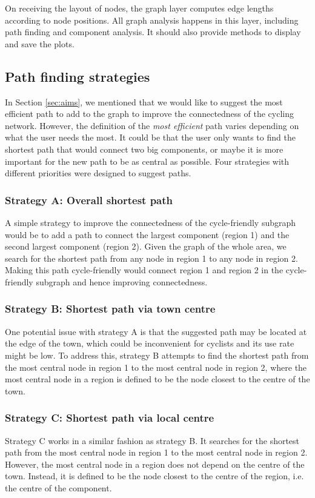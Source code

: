 \documentclass[12pt,a4paper]{report}
\begin{document}
On receiving the layout of nodes, the graph layer computes edge lengths according to node positions. All graph analysis happens in this layer, including path finding and component analysis. It should also provide methods to display and save the plots.

\subsection{Path finding strategies} \label{sec:strategies}
In Section \ref{sec:aims}, we mentioned that we would like to suggest the most efficient path to add to the graph to improve the connectedness of the cycling network. However, the definition of the \textit{most efficient} path varies depending on what the user needs the most. It could be that the user only wants to find the shortest path that would connect two big components, or maybe it is more important for the new path to be as central as possible. Four strategies with different priorities were designed to suggest paths.

\subsubsection*{Strategy A: Overall shortest path}
A simple strategy to improve the connectedness of the cycle-friendly subgraph would be to add a path to connect the largest component (region 1) and the second largest component (region 2). Given the graph of the whole area, we search for the shortest path from any node in region 1 to any node in region 2. Making this path cycle-friendly would connect region 1 and region 2 in the cycle-friendly subgraph and hence improving connectedness.

\subsubsection*{Strategy B: Shortest path via town centre}
One potential issue with strategy A is that the suggested path may be located at the edge of the town, which could be inconvenient for cyclists and its use rate might be low. To address this, strategy B attempts to find the shortest path from the most central node in region 1 to the most central node in region 2, where the most central node in a region is defined to be the node closest to the centre of the town.

\subsubsection*{Strategy C: Shortest path via local centre}
Strategy C works in a similar fashion as strategy B. It searches for the shortest path from the most central node in region 1 to the most central node in region 2. However, the most central node in a region does not depend on the centre of the town. Instead, it is defined to be the node closest to the centre of the region, i.e. the centre of the component.
\end{document}
